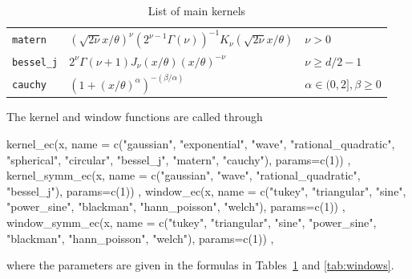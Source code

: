 \begin{table}[htbp!]
\begin{tabular}{l l l}
        \texttt{matern}              & \(\left(\sqrt{2\nu} {x}/{\theta}\right)^{\nu} \left(2^{\nu - 1}  \Gamma(\nu)\right)^{-1} K_{\nu}(\sqrt{2\nu} {x}/{\theta})\) & \(\nu > 0\) \\%
        \texttt{bessel\_j}           & \(2^{\nu} \Gamma(\nu + 1) J_{\nu}(x / \theta) (x / \theta)^{-\nu}\) & \(\nu \geq d/2  -1\) \\%
         \texttt{cauchy}             & \((1 + (x / \theta)^{\alpha})^{-(\beta / \alpha)}\) & \(\alpha \in (0, 2], \beta \geq 0\) \\ \bottomrule %
    \end{tabular}
    \caption{List of main kernels}
    \label{tab:kernels}
\end{table}

The kernel and window functions are called through
\begin{example}
kernel_ec(x, name = c("gaussian", "exponential", "wave", "rational_quadratic",
        "spherical", "circular", "bessel_j", "matern", "cauchy"), params=c(1)) ,
kernel_symm_ec(x, name = c("gaussian", "wave", "rational_quadratic", "bessel_j"),
        params=c(1)) ,
window_ec(x, name = c("tukey", "triangular", "sine", "power_sine", "blackman",
        "hann_poisson", "welch"), params=c(1)) ,
window_symm_ec(x, name = c("tukey", "triangular", "sine", "power_sine", "blackman",
        "hann_poisson", "welch"), params=c(1)) ,
\end{example}
where the parameters are given in the formulas in Tables~\ref{tab:kernels} and \ref{tab:windows}.

